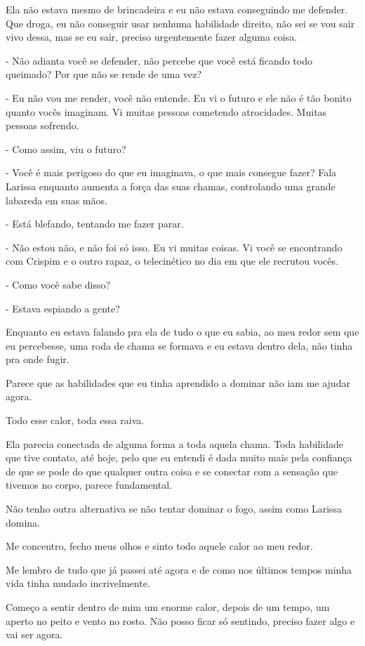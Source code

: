 Ela não estava mesmo de brincadeira e eu não estava conseguindo me defender. Que droga, eu não conseguir usar nenhuma habilidade direito, não sei se vou sair vivo dessa, mas se eu sair, preciso urgentemente fazer alguma coisa.

- Não adianta você se defender, não percebe que você está ficando todo queimado? Por que não se rende de uma vez?

- Eu não vou me render, você não entende. Eu vi o futuro e ele não é tão bonito quanto vocês imaginam. Vi muitas pessoas cometendo atrocidades. Muitas pessoas sofrendo.

- Como assim, viu o futuro?

- Você é mais perigoso do que eu imaginava, o que mais consegue fazer? Fala Larissa enquanto aumenta a força das suas chamas, controlando uma grande labareda em suas mãos.

- Está blefando, tentando me fazer parar. 

- Não estou não, e não foi só isso. Eu vi muitas coisas. Vi você se encontrando com Crispim e o outro rapaz, o telecinético no dia em que ele recrutou vocês.

- Como você sabe disso?

- Estava espiando a gente?

Enquanto eu estava falando pra ela de tudo o que eu sabia, ao meu redor sem que eu percebesse, uma roda de chama se formava e eu estava dentro dela, não tinha pra onde fugir.

Parece que as habilidades que eu tinha aprendido a dominar não iam me ajudar agora.

Todo esse calor, toda essa raiva.

Ela parecia conectada de alguma forma a toda aquela chama. Toda habilidade que tive contato, até hoje, pelo que eu entendi é dada muito mais pela confiança de que se pode do que qualquer outra coisa e se conectar com a sensação que tivemos no corpo, parece fundamental.

Não tenho outra alternativa se não tentar dominar o fogo, assim como Larissa domina.

Me concentro, fecho meus olhos e sinto todo aquele calor ao meu redor.

Me lembro de tudo que já passei até agora e de como nos últimos tempos minha vida tinha mudado incrivelmente.

Começo a sentir dentro de mim um enorme calor, depois de um tempo, um aperto no peito e vento no rosto. Não posso ficar só sentindo, preciso fazer algo e vai ser agora.

